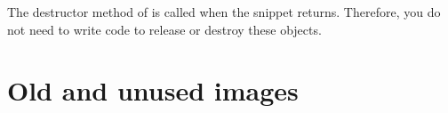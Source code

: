 \documentclass[letterpaper,12pt,english,openany,oneside]{sphinxmanual}
\begin{document}
The destructor method of  is called when the snippet returns. Therefore, you do not need to write code to release or destroy these objects.


\chapter{Old and unused images}
\label{\detokenize{images:old-and-unused-images}}\label{\detokenize{images::doc}}
\noindent{}

\noindent{}

\noindent{}

\noindent{}



\renewcommand{\indexname}{Index}
\printindex
\end{document}
